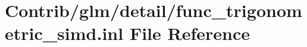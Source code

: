 \hypertarget{func__trigonometric__simd_8inl}{}\section{Contrib/glm/detail/func\+\_\+trigonometric\+\_\+simd.inl File Reference}
\label{func__trigonometric__simd_8inl}
